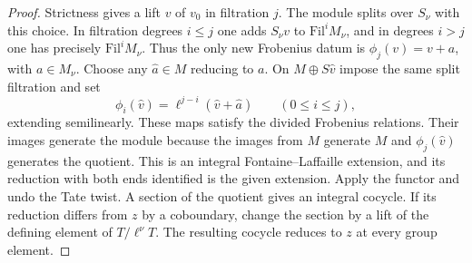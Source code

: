 \documentclass[a4paper,11pt]{article}
\theoremstyle{definition}
\theoremstyle{remark}
\numberwithin{equation}{section}
\begin{document}
\begin{proof}
Strictness gives a lift \(v\) of \(v_0\) in filtration \(j\). The module
splits over \(S_\nu\) with this choice. In filtration degrees \(i\le j\)
one adds \(S_\nu v\) to \(\mathrm{Fil}^i M_\nu\), and in degrees \(i>j\)
one has precisely \(\mathrm{Fil}^i M_\nu\). Thus the only new Frobenius
datum is \(\phi_j(v)=v+a\), with \(a\in M_\nu\). Choose any
\(\widehat a\in M\) reducing to \(a\). On \(M\oplus S\widehat v\) impose
the same split filtration and set
\[
       \phi_i(\widehat v)=\ell^{j-i}(\widehat v+\widehat a)
                         \qquad(0\le i\le j),
\]
extending semilinearly. These maps satisfy the divided Frobenius
relations. Their images generate the module because the images from
\(M\) generate \(M\) and \(\phi_j(\widehat v)\) generates the quotient.
This is an integral Fontaine--Laffaille extension, and its reduction
with both ends identified is the given extension. Apply the functor
and undo the Tate twist. A section of the quotient gives an integral
cocycle. If its reduction differs from \(z\) by a coboundary, change
the section by a lift of the defining element of \(T/\ell^\nu T\).
The resulting cocycle reduces to \(z\) at every group element.
\end{proof}
\end{document}

